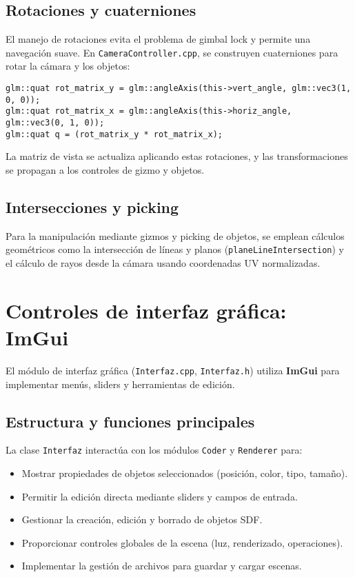 \subsection{Rotaciones y cuaterniones}

El manejo de rotaciones evita el problema de gimbal lock y permite una
navegación suave. En \texttt{CameraController.cpp}, se construyen cuaterniones
para rotar la cámara y los objetos:
\begin{verbatim}
glm::quat rot_matrix_y = glm::angleAxis(this->vert_angle, glm::vec3(1, 0, 0));
glm::quat rot_matrix_x = glm::angleAxis(this->horiz_angle, glm::vec3(0, 1, 0));
glm::quat q = (rot_matrix_y * rot_matrix_x);
\end{verbatim}
La matriz de vista se actualiza aplicando estas rotaciones, y las
transformaciones se propagan a los controles de gizmo y objetos.

\subsection{Intersecciones y picking}

Para la manipulación mediante gizmos y picking de objetos, se emplean cálculos
geométricos como la intersección de líneas y planos
(\texttt{planeLineIntersection}) y el cálculo de rayos desde la cámara usando
coordenadas UV normalizadas.

\section{Controles de interfaz gráfica: ImGui}

El módulo de interfaz gráfica (\texttt{Interfaz.cpp}, \texttt{Interfaz.h})
utiliza \textbf{ImGui} para implementar menús, sliders y herramientas de
edición.

\subsection{Estructura y funciones principales}

La clase \texttt{Interfaz} interactúa con los módulos \texttt{Coder} y
\texttt{Renderer} para:
\begin{itemize}
    \item Mostrar propiedades de objetos seleccionados (posición, color, tipo, tamaño).
    \item Permitir la edición directa mediante sliders y campos de entrada.
    \item Gestionar la creación, edición y borrado de objetos SDF.
    \item Proporcionar controles globales de la escena (luz, renderizado, operaciones).
    \item Implementar la gestión de archivos para guardar y cargar escenas.
\end{itemize}

